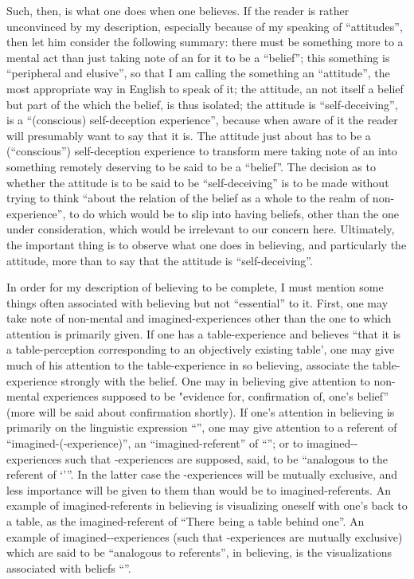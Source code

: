 Such, then, is what one does when one believes. If the reader is rather 
unconvinced by my description, especially because of my speaking of 
\enquote{attitudes}, then let him consider the following summary: there must be 
something more to a mental act than just taking note of an  for it 
to be a \enquote{belief}; this something is \enquote{peripheral and elusive}, so that I am 
calling the something an \enquote{attitude}, the most appropriate way in English to 
speak of it; the attitude, an  not itself a belief but part of the 
 which  the belief, is thus isolated; the attitude is 
\enquote{self-deceiving}, is a \enquote{(conscious) self-deception experience}, because when 
aware of it the reader will presumably want to say that it is. The attitude just 
about has to be a (\enquote{conscious}) self-deception experience to transform mere 
taking note of an  into something remotely deserving to be said to 
be a \enquote{belief}. The decision as to whether the attitude is to be said to be 
\enquote{self-deceiving} is to be made without trying to think \enquote{about the relation of 
the belief as a whole to the realm of non-experience}, to do which would be 
to slip into having beliefs, other than the one under consideration, which 
would be irrelevant to our concern here. Ultimately, the important thing is 
to observe what one does in believing, and particularly the attitude, more 
than to say that the attitude is \enquote{self-deceiving}. 

In order for my description of believing to be complete, I must mention 
some things often associated with believing but not \enquote{essential} to it. First, 
one may take note of non-mental and imagined-experiences other than the 
one to which attention is primarily given. If one has a table-experience and 
believes \enquote{that it is a table-perception corresponding to an objectively existing 
table', one may give much of his attention to the table-experience in so 
believing, associate the table-experience strongly with the belief. One may in 
believing give attention to non-mental experiences supposed to be "evidence 
for, confirmation of, one's belief} (more will be said about confirmation 
shortly). If one's attention in believing is primarily on the linguistic 
expression \enquote{\x}, one may give attention to a referent of 
\enquote{imagined-\x(-experience)}, an \enquote{imagined-referent} of \enquote{\x}; or to 
imagined-\y-experiences such that \y-experiences are supposed, said, to be 
\enquote{analogous to the referent of \enquote{\x}}. In the latter case the \y-experiences will be 
mutually exclusive, and less importance will be given to them than would be 
to imagined-referents. An example of imagined-referents in believing is 
visualizing oneself with one's back to a table, as the imagined-referent of 
\enquote{There being a table behind one}. An example of imagined-\y-experiences 
(such that \y-experiences are mutually exclusive) which are said to be 
\enquote{analogous to referents}, in believing, is the visualizations associated with 
beliefs \enquote{}. 

